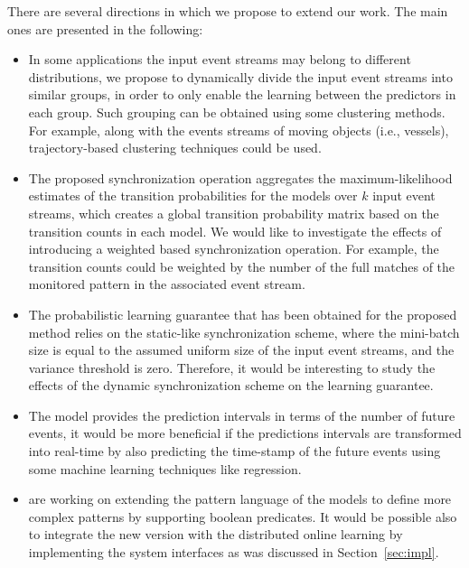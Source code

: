 There are several directions in which we propose to extend our work. The main ones are presented in the following:

\begin{itemize}[noitemsep]
	
\item In some applications the input event streams may belong to different distributions, we propose to dynamically divide the input event streams into similar groups, in order to only enable the learning between the predictors in each group.  Such grouping can be obtained using some clustering methods. For example, along with the events streams of moving objects (i.e., vessels), trajectory-based clustering techniques \cite{lee2007trajectory,liu2014knowledge} could be used.
 
\item  The proposed synchronization operation aggregates the maximum-likelihood estimates of the transition probabilities for the \pmcmr models over $k$ input event streams, which creates a global transition probability matrix based on the transition counts in each model. We would like to investigate the effects of introducing a weighted based synchronization operation. For example, the transition counts could be weighted by the number of the full matches of the monitored pattern in the associated event stream. 

\item The probabilistic learning guarantee that has been obtained for the proposed method relies on the static-like synchronization scheme, where the mini-batch size is equal to the assumed uniform size of the input event streams, and the variance threshold is zero. Therefore, it would be interesting to study the effects of the dynamic synchronization scheme on the learning guarantee.

\item The \pmcmr model provides the prediction intervals in terms of the number of future events, it would be more beneficial if the predictions intervals are transformed into real-time by also predicting the time-stamp of the future events using some machine learning techniques like regression.  

\item \citet{alevizos2017event} are working on extending the pattern language of the \pmcmr models to define more complex patterns by supporting boolean predicates. It would be possible also to integrate the new version with the distributed online learning by implementing the system interfaces as was discussed in Section~\ref{sec:impl}.


\end{itemize}
